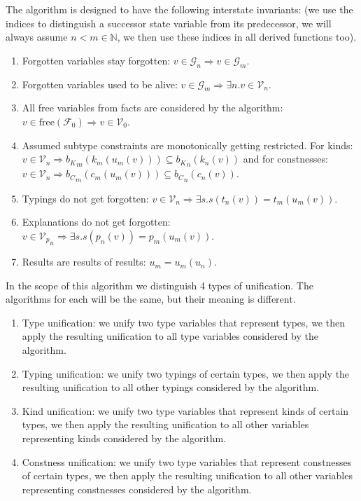 \begin{defn}
    The algorithm is designed to have the following interstate invariants: (we use the indices to distinguish a successor state variable from its predecessor, we will always assume $n < m \in \mathbb{N}$, we then use these indices in all derived functions too).

    \begin{enumerate}
        \item Forgotten variables stay forgotten: $v \in \mathcal{G}_n \Rightarrow v \in \mathcal{G}_m$.
        \item Forgotten variables used to be alive: $v \in \mathcal{G}_m \Rightarrow \exists n . v \in \mathcal{V}_n$.
        \item All free variables from facts are considered by the algorithm: $v \in \mathrm{free} (\mathcal{F}_0) \Rightarrow v \in \mathcal{V}_0$.
        \item Assumed subtype constraints are monotonically getting restricted. For kinds: $v \in {\mathcal{V}}_n \Rightarrow {b_K}_m (k_m(u_m(v))) \subseteq {b_K}_n (k_n(v))$ and for constnesses: $v \in {\mathcal{V}}_n \Rightarrow {b_C}_m (c_m(u_m(v))) \subseteq {b_C}_n (c_n(v))$.
        \item Typings do not get forgotten: $v \in {\mathcal{V}}_n \Rightarrow \exists s . s(t_n(v)) = t_m(u_m (v))$.
        \item Explanations do not get forgotten: $v \in {\mathcal{V}_p}_n \Rightarrow \exists s . s(p_n(v)) = p_m(u_m (v))$.
        \item Results are results of results: $u_m = u_m (u_n)$.
    \end{enumerate}
\end{defn}

\begin{defn}[Unifications]
    In the scope of this algorithm we distinguish 4 types of unification. The algorithms for each will be the same, but their meaning is different.

    \begin{enumerate}
        \item Type unification: we unify two type variables that represent types, we then apply the resulting unification to all type variables considered by the algorithm. \label{tUni}
        \item Typing unification: we unify two typings of certain types, we then apply the resulting unification to all other typings considered by the algorithm.
        \item Kind unification: we unify two type variables that represent kinds of certain types, we then apply the resulting unification to all other variables representing kinds considered by the algorithm. \label{kUni}
        \item Constness unification: we unify two type variables that represent constnesses of certain types, we then apply the resulting unification to all other variables representing constnesses considered by the algorithm. \label{cUni} 
    \end{enumerate}
\end{defn}

